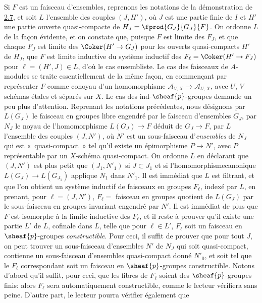 \documentclass[10pt]{../fichiers-configuration-latex/smfart}
\begin{document}
Si $F$ est un faisceau d'ensembles, reprenons les notations de la
démonstration de \hyperref[IX.prop2.7]{2.7}, et soit $L$ l'ensemble des couples $(J,H')$, où
$J$ est une partie finie de $I$ et $H'$ une partie ouverte
quasi-compacte de $H_J=\fprod{G_J}{G_J}{F}$. On ordonne $L$ de la fa\c
con évidente, et on constate que, puisque $F$ est limite des $F_J$, et
que chaque $F_J$ est limite des $\Coker(H'\rightarrow G_J)$ pour les
ouverts quasi-compacts $H'$ de $H_J$, que $F$ est limite inductive du
système inductif des $F_{\ell}=\Coker(H'\rightarrow F_J)$ pour
$\ell=(H',J)\in L$, d'où le cas ensembliste. Le cas des faisceaux de
$A$-modules se traite essentiellement de la même façon, en
commençant par représenter $F$ comme conoyau d'un homomorphisme
$𝒜_{V,X}\rightarrow 𝒜_{U,X}$, avec $U$, $V$ schémas étales et
séparés sur $X$. Le cas des ind-$\sheaf{p}$-groupes demande un peu plus
d'attention. Reprenant les notations précédentes, nous désignons par
$L(G_J)$ le faisceau en groupes libre engendré par le faisceau
d'ensembles $G_J$, par $N_J$ le noyau de l'homomorphisme
$L(G_J)\rightarrow F$ déduit de $G_J\rightarrow F$, par $L$ l'ensemble
des couples $(J,N')$, où $N'$ est un sous-faisceau d'\emph{ensembles}
de $N_J$ qui est « quasi-compact » \ie tel qu'il existe un
épimorphisme $P\rightarrow N'$, avec $P$ représentable par un
$X$-schéma quasi-compact. On ordonne $L$ en déclarant que $(J,N')$ est
plus petit que $(J_1, N'_1)$ si $J\subset J_1$ et si
l'homomorphisme\pageoriginale canonique $L(G_J)\rightarrow L(G_{J_1})$
applique $N_1$ dans $N'_1$. Il est immédiat que $L$ est filtrant, et
que l'on obtient un système inductif de faisceaux en groupes
$F_{\ell}$, indexé par $L$, en prenant, pour $\ell=(J,N')$,
$F_{\ell}=$ faisceau en groupes quotient de $L(G_J)$ par le
sous-faisceau en groupes invariant engendré par $N'$. Il est immédiat
de plus que $F$ est isomorphe à la limite inductive des $F_{\ell}$, et
il reste à prouver qu'il existe une partie $L'$ de $L$, cofinale dans
$L$, telle que pour $\ell\in L'$, $F_{\ell}$ soit un faisceau en
$\sheaf{p}$-groupes \emph{constructible}. Pour ceci, il suffit de prouver
que pour tout $J$, on peut trouver un sous-faisceau d'ensembles $N'$
de $N_J$ qui soit quasi-compact, contienne un sous-faisceau
d'ensembles quasi-compact donné $N'_0$, et soit tel que le $F_{\ell}$
correspondant soit un faisceau en $\sheaf{p}$-groupes
constructible. Notons d'abord qu'il suffit, pour ceci, que les fibres
de $F_{\ell}$ soient des $\sheaf{p}$-groupes finis: alors $F_{\ell}$ sera
automatiquement constructible, comme le lecteur vérifiera sans
peine. D'autre part, le lecteur pourra vérifier également que
\end{document}
